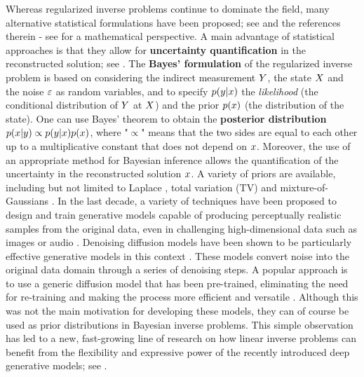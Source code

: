 Whereas regularized inverse problems continue to dominate the field, many alternative statistical formulations have been proposed; see \cite{besag1991bayesian,idier2013bayesian,marnissi2017variational} and the references therein - see \cite{stuart2010inverse} for a mathematical perspective. A main advantage of statistical approaches is that they allow for \textbf{uncertainty quantification} in the reconstructed solution; see \cite{dashti2017bayesian}.
The \textbf{Bayes' formulation} of the regularized inverse problem is based on considering the indirect measurement $Y$, the state $X$ and the noise $\varepsilon$ as random variables, and to specify $p(y |x)$ the \emph{likelihood} (the conditional distribution of $Y$ at $X$)  and the prior $p(x)$ (the distribution of the state). One can use Bayes' theorem to obtain the \textbf{posterior distribution} $p(x|y) \propto p(y|x) p(x)$, where "$\propto$" means that the two sides are equal to each other up to a multiplicative constant that does not depend on $x$.
Moreover, the use of an appropriate method for Bayesian inference allows the quantification of the uncertainty in the reconstructed solution $x$. A variety of priors are available, including but not limited to Laplace \cite{figueiredo2007majorization}, total variation (TV) \cite{kaipio2000statistical} and mixture-of-Gaussians \cite{fergus2006removing}.
In the last decade, a variety of techniques have been proposed to design and train generative models capable of producing perceptually realistic samples from the original data, even in challenging high-dimensional data such as images or audio \cite{kingma2019introduction,kobyzev2020normalizing,gui2021review}.
Denoising diffusion models have been shown to be particularly effective generative models in this context \cite{sohl2015deep,song2020score,song2021denoising,song2021maximum,benton2022denoising}.
These models convert noise into the original data domain through a series of denoising steps.
A popular approach is to use a generic diffusion model that has been pre-trained, eliminating the need for re-training and making the process more efficient and versatile \cite{trippe2023diffusion,zhang2023towards}.
Although this was not the main motivation for developing these models, they can of course be used as prior distributions in Bayesian inverse problems.
This simple observation has led to a new, fast-growing line of research on how linear inverse problems can benefit from the flexibility and expressive power of the recently introduced deep generative models; see \cite{arjomand2017deep,wei2022deep,su2022survey,kaltenbach2023semi,shin2023physics,zhihang2023domain,sahlstrom2023utilizing}.
